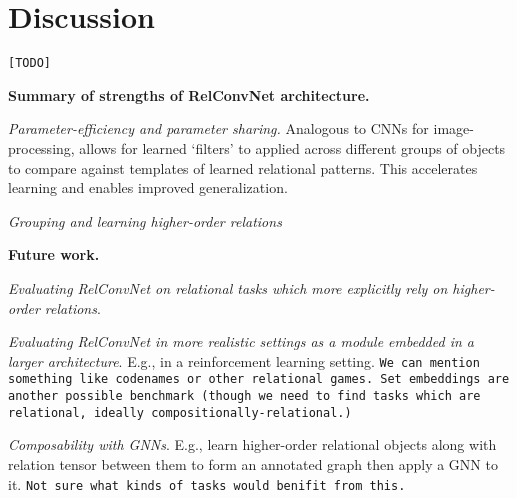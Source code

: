 
\section{Discussion}\label{sec:discussion}

\texttt{[TODO]}

\textbf{Summary of strengths of RelConvNet architecture.}

\textit{Parameter-efficiency and parameter sharing.} Analogous to CNNs for image-processing, allows for learned `filters' to applied across different groups of objects to compare against templates of learned relational patterns. This accelerates learning and enables improved generalization.

\textit{Grouping and learning higher-order relations}


\textbf{Future work.} 

\textit{Evaluating RelConvNet on relational tasks which more explicitly rely on higher-order relations}.

\textit{Evaluating RelConvNet in more realistic settings as a module embedded in a larger architecture}. E.g., in a reinforcement learning setting. \texttt{We can mention something like codenames or other relational games. Set embeddings are another possible benchmark (though we need to find tasks which are relational, ideally compositionally-relational.)}

\textit{Composability with GNNs}. E.g., learn higher-order relational objects along with relation tensor between them to form an annotated graph then apply a GNN to it. \texttt{Not sure what kinds of tasks would benifit from this.}

